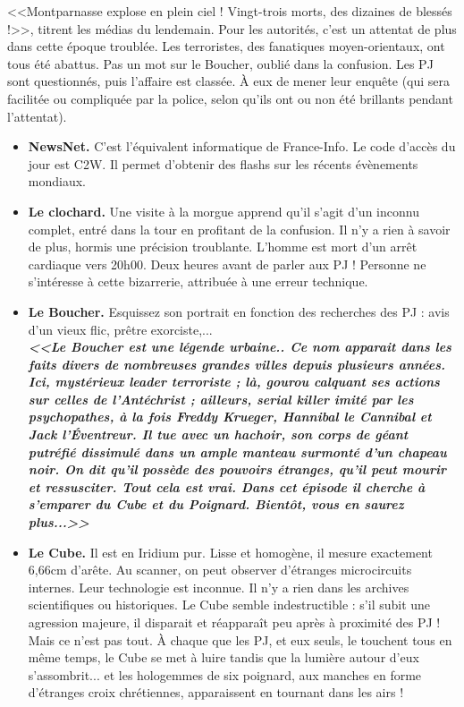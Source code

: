 \documentclass[11pt,twoside,a4paper]{book}
\begin{document}
<<Montparnasse explose en plein ciel ! Vingt-trois morts, des dizaines de bless{\'e}s !>>, titrent les m{\'e}dias du lendemain. Pour les autorit{\'e}s, c'est un attentat de plus dans cette {\'e}poque troubl{\'e}e. Les terroristes, des fanatiques moyen-orientaux, ont tous {\'e}t{\'e} abattus. Pas un mot sur le Boucher, oubli{\'e} dans la confusion. Les PJ sont questionn{\'e}s, puis l'affaire est class{\'e}e. {\`A} eux de mener leur enqu{\^e}te (qui sera facilit{\'e}e ou compliqu{\'e}e par la police, selon qu'ils ont ou non {\'e}t{\'e} brillants pendant l'attentat).~\\
\setlength\parindent{20pt}
\begin{itemize}
	\item \textbf{NewsNet. }C'est l'{\'e}quivalent informatique de France-Info. Le code d'acc{\`e}s du jour est C2W. Il permet d'obtenir des flashs sur les r{\'e}cents {\'e}v{\`e}nements mondiaux.
	\item \textbf{Le clochard. }Une visite {\`a} la morgue apprend qu'il s'agit d'un inconnu complet, entr{\'e} dans la tour en profitant de la confusion. Il n'y a rien {\`a} savoir de plus, hormis une pr{\'e}cision troublante. L'homme est mort d'un arr{\^e}t cardiaque vers 20h00. Deux heures avant de parler aux PJ ! Personne ne s'int{\'e}resse {\`a} cette bizarrerie, attribu{\'e}e {\`a} une erreur technique.
	\item \textbf{Le Boucher. }Esquissez son portrait en fonction des recherches des PJ : avis d'un vieux flic, pr{\^e}tre exorciste,...~\\
		\textbf{\small \emph{<<Le Boucher est une l{\'e}gende urbaine.. Ce nom apparait dans les faits divers de nombreuses grandes villes depuis plusieurs ann{\'e}es. Ici, myst{\'e}rieux leader terroriste ; l{\`a}, gourou calquant ses actions sur celles de l'Ant{\'e}christ ; ailleurs, serial killer imit{\'e} par les psychopathes, {\`a} la fois Freddy Krueger, Hannibal le Cannibal et Jack l'{\'E}ventreur. Il tue avec un hachoir, son corps de g{\'e}ant putr{\'e}fi{\'e} dissimul{\'e} dans un ample manteau surmont{\'e} d'un chapeau noir. On dit qu'il poss{\`e}de des pouvoirs {\'e}tranges, qu'il peut mourir et ressusciter. Tout cela est vrai. Dans cet {\'e}pisode il cherche {\`a} s'emparer du Cube et du Poignard. Bient{\^o}t, vous en saurez plus...>>}}
	\item \textbf{Le Cube. }Il est en Iridium pur. Lisse et homog{\`e}ne, il mesure exactement 6,66cm d'ar{\^e}te. Au scanner, on peut observer d'{\'e}tranges microcircuits internes. Leur technologie est inconnue. Il n'y a rien dans les archives scientifiques ou historiques. Le Cube semble indestructible : s'il subit une agression majeure, il disparait et r{\'e}appara{\^i}t peu apr{\`e}s {\`a} proximit{\'e} des PJ ! Mais ce n'est pas tout. {\`A} chaque que les PJ, et eux seuls, le touchent tous en m{\^e}me temps, le Cube se met {\`a} luire tandis que la lumi{\`e}re autour d'eux s'assombrit... et les hologemmes de six poignard, aux manches en forme d'{\'e}tranges croix chr{\'e}tiennes, apparaissent en tournant dans les airs !

\end{itemize}
\end{document}
